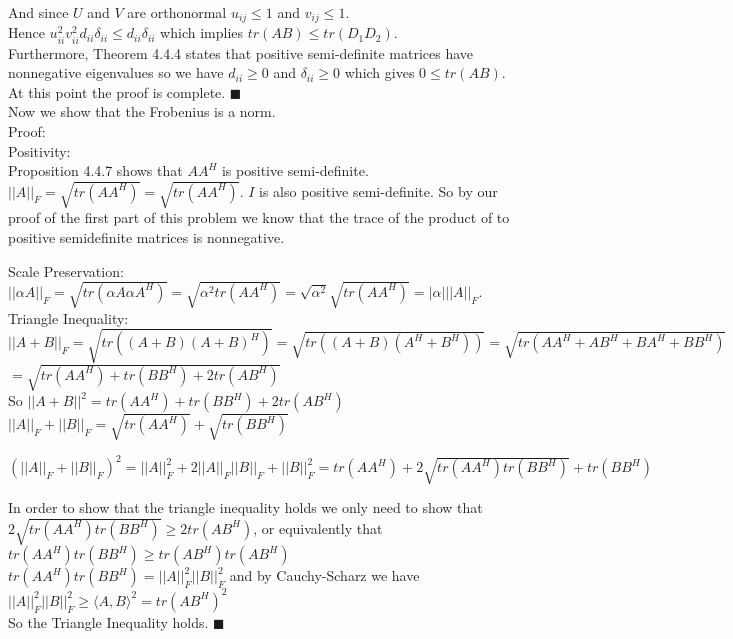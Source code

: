 \documentclass[letterpaper,12pt]{article}
\theoremstyle{definition}
\begin{document}
 And since $U$ and $V$ are orthonormal $u_{ij}\leq 1$ and $v_{ij}\leq 1$.\\
 Hence $u_{ii}^2v_{ii}^2d_{ii}\delta_{ii}\leq d_{ii}\delta_{ii}$ which implies $tr(AB) \leq tr(D_1D_2)$.\\
Furthermore, Theorem 4.4.4 states that positive semi-definite matrices have nonnegative eigenvalues so we have $d_{ii}\geq 0$ and $\delta_{ii}\geq 0$ which gives $0\leq tr(AB)$. At this point the proof is complete. 
\hfill $\blacksquare$\\
Now we show that the Frobenius is a norm.\\
Proof:\\
Positivity:\\
Proposition 4.4.7 shows that $AA^H$ is positive semi-definite. $||A||_F = \sqrt{tr(AA^H)} = \sqrt{tr(AA^H)}$. $I$ is also positive semi-definite. So by our proof of the first part of this problem we know that the trace of the product of to positive semidefinite matrices is nonnegative. 

Scale Preservation:\\$||\alpha A||_F =\sqrt{tr(\alpha A \alpha A^H)} = \sqrt{  \alpha^2tr(AA^H)} = \sqrt{\alpha^2}\sqrt{tr(AA^H)} = |\alpha|||A||_F$.\\  

Triangle Inequality:\\
$||A+B||_F = \sqrt{ tr( (A+B)(A+B)^H    )     } = \sqrt{ tr( (A+B)(A^H+B^H)    )     } = \sqrt{ tr( AA^H + AB^H +BA^H+BB^H    )     }$\\
$=\sqrt{tr(AA^H) + tr(BB^H) + 2tr(AB^H)       }$\\

So $||A+B||^2 = tr(AA^H) + tr(BB^H) + 2tr(AB^H)$\\

$||A||_F + ||B||_F = \sqrt{tr(AA^H)} + \sqrt{tr(BB^H)}$

$(||A||_F + ||B||_F)^2 = ||A||_F^2 +2||A||_F||B||_F + ||B||_F^2 = tr(AA^H)+ 2\sqrt{tr(AA^H)tr(BB^H)} + tr(BB^H)$ 

In order to show that the triangle inequality holds we only need to show that $2\sqrt{tr(AA^H)tr(BB^H)} \geq 2tr(AB^H) $, or equivalently that $tr(AA^H)tr(BB^H) \geq tr(AB^H)tr(AB^H)$ \\

$tr(AA^H)tr(BB^H) = ||A||_F^2||B||_F^2$ and by Cauchy-Scharz we have\\
$ ||A||_F^2||B||_F^2 \geq \langle A,B\rangle^2 =tr(AB^H)^2$\\

So the Triangle Inequality holds. \hfill $\blacksquare$\\
\end{document}
